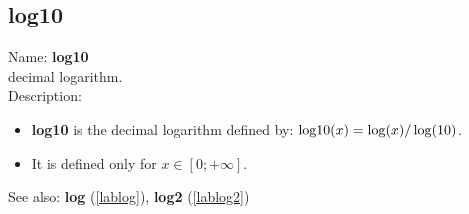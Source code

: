 \subsection{log10}
\label{lablog10}
\noindent Name: \textbf{log10}\\
decimal logarithm.\\

\noindent Description: \begin{itemize}

\item \textbf{log10} is the decimal logarithm defined by: ${\rm log10}(x) = \log(x)/\log(10)$.

\item It is defined only for $x \in [0; +\infty]$.
\end{itemize}
See also: \textbf{log} (\ref{lablog}), \textbf{log2} (\ref{lablog2})
